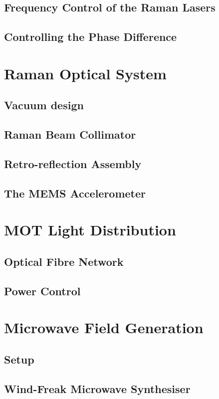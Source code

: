 \subsection{Frequency Control of the Raman Lasers}
\subsection{Controlling the Phase Difference}
\section{Raman Optical System}\label{sec:setup_ramanoptics}
\subsection{Vacuum design}\label{subsec:setup_ramandesign}
\subsection{Raman Beam Collimator}\label{subsec:setup_ramancollimator}
\subsection{Retro-reflection Assembly}\label{subsec:setup_ramanmirror}
\subsection{The MEMS Accelerometer}
\section{MOT Light Distribution}\label{sec:setup_lightdist}
\subsection{Optical Fibre Network}\label{subsec:setup_fibrenet}
\subsection{Power Control}\label{subsec:setup_lightpower}
\section{Microwave Field Generation}\label{sec:setup_microwave}
\subsection{Setup}\label{subsec:setup_microwave_setup}
\subsection{Wind-Freak Microwave Synthesiser}\label{subsec:setup_windfreak}